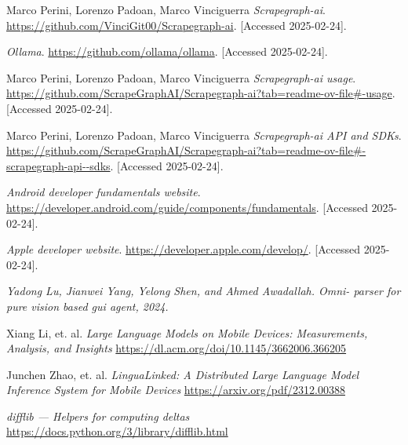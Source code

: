\documentclass[licencjacka,en]{pracamgr}
\begin{document}
\begin{thebibliography}{99}
Marco Perini, Lorenzo Padoan, Marco Vinciguerra
\textit{Scrapegraph-ai}.
\url{https://github.com/VinciGit00/Scrapegraph-ai}.
[Accessed 2025-02-24].

\textit{Ollama}.
\url{https://github.com/ollama/ollama}.
[Accessed 2025-02-24].

Marco Perini, Lorenzo Padoan, Marco Vinciguerra
\textit{Scrapegraph-ai usage}.
\url{https://github.com/ScrapeGraphAI/Scrapegraph-ai?tab=readme-ov-file#-usage}.
[Accessed 2025-02-24].

Marco Perini, Lorenzo Padoan, Marco Vinciguerra
\textit{Scrapegraph-ai API and SDKs}.
\url{https://github.com/ScrapeGraphAI/Scrapegraph-ai?tab=readme-ov-file#-scrapegraph-api--sdks}.
[Accessed 2025-02-24].

\textit{Android developer fundamentals website}.
\url{https://developer.android.com/guide/components/fundamentals}.
[Accessed 2025-02-24].

\textit{Apple developer website}.
\url{https://developer.apple.com/develop/}.
[Accessed 2025-02-24].

\textit{Yadong Lu, Jianwei Yang, Yelong Shen, and Ahmed Awadallah. Omni-
parser for pure vision based gui agent, 2024.}

Xiang Li, et. al.
\textit{Large Language Models on Mobile Devices: Measurements, Analysis, and Insights}
\url{https://dl.acm.org/doi/10.1145/3662006.366205}

Junchen Zhao, et. al.
\textit{LinguaLinked: A Distributed Large Language Model Inference System for Mobile Devices}
\url{https://arxiv.org/pdf/2312.00388}

\textit{difflib — Helpers for computing deltas}
\url{https://docs.python.org/3/library/difflib.html}

\end{thebibliography}
\end{document}
